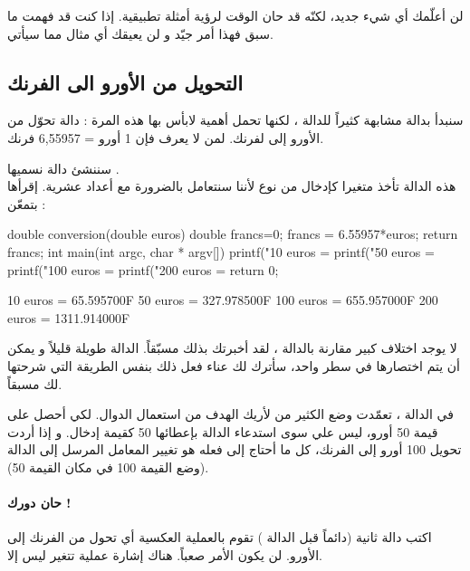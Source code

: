 لن أعلّمك أي شيء جديد، لكنّه قد حان الوقت لرؤية أمثلة تطبيقية. إذا كنت قد فهمت ما سبق فهذا أمر جيّد و لن يعيقك أي مثال مما سيأتي.

\subsection{التحويل من الأورو الى الفرنك}

سنبدأ بدالة مشابهة كثيراً للدالة
،
لكنها تحمل أهمية لابأس بها هذه المرة : دالة تحوّل من الأورو إلى لفرنك. لمن لا يعرف فإن 1 أورو = 6,55957 فرنك.

سننشئ دالة نسميها 
.\\
هذه الدالة تأخذ متغيرا كإدخال من نوع 
لأننا سنتعامل بالضرورة مع أعداد عشرية. إقرأها بتمعّن :

\begin{Csource}
double conversion(double euros)
{
	double francs=0;
	francs = 6.55957*euros;
	return francs;
}
int main(int argc, char * argv[])
{
	printf("10 euros = %
	printf("50 euros = %
	printf("100 euros = %
	printf("200 euros = %
	return 0;
}
\end{Csource}

\begin{Console}
10 euros = 65.595700F
50 euros = 327.978500F
100 euros = 655.957000F
200 euros = 1311.914000F
\end{Console}

لا يوجد اختلاف كبير مقارنة بالدالة 
،
لقد أخبرتك بذلك مسبّقاً. الدالة 
طويلة قليلاً و يمكن أن يتم اختصارها في سطر واحد، سأترك لك عناء فعل ذلك بنفس الطريقة التي شرحتها لك مسبقاً.

في الدالة
،
تعمّدت وضع الكثير من
لأريك الهدف من استعمال الدوال. لكي أحصل على قيمة 50 أورو، ليس علي سوى استدعاء الدالة 
بإعطائها 50 كقيمة إدخال. و إذا أردت تحويل 100 أورو إلى الفرنك، كل ما أحتاج إلى فعله هو تغيير المعامل المرسل إلى الدالة (وضع القيمة 100 في مكان القيمة 50).

\paragraph{حان دورك !}
اكتب دالة ثانية (دائماً قبل الدالة 
)
تقوم بالعملية العكسية أي تحول من الفرنك إلى الأورو. لن يكون الأمر صعباً. هناك إشارة عملية تتغير ليس إلا.

